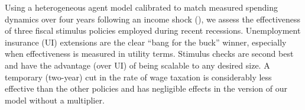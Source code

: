 \documentclass[\econtexRoot/HAFiscal]{subfiles}
\begin{document}
Using a heterogeneous agent model calibrated to match measured spending dynamics over four years following an income shock (\cite{fagereng_mpc_2021}), we assess the effectiveness of three fiscal stimulus policies employed during recent recessions.  Unemployment insurance (UI) extensions are the clear ``bang for the buck'' winner, especially when effectiveness is measured in utility terms.  Stimulus checks are second best and have the advantage (over UI) of being scalable to any desired size.  A temporary (two-year) cut in the rate of wage taxation is considerably less effective than the other policies and has negligible effects in the version of our model without a multiplier.
\end{document}
